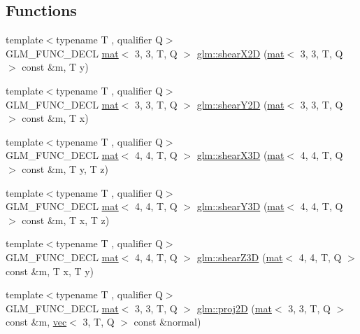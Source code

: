 \subsection*{Functions}
\begin{DoxyCompactItemize}
\item 
{\footnotesize template$<$typename T , qualifier Q$>$ }\\G\+L\+M\+\_\+\+F\+U\+N\+C\+\_\+\+D\+E\+CL \hyperlink{structglm_1_1mat}{mat}$<$ 3, 3, T, Q $>$ \hyperlink{group__gtx__transform2_gabf714b8a358181572b32a45555f71948}{glm\+::shear\+X2D} (\hyperlink{structglm_1_1mat}{mat}$<$ 3, 3, T, Q $>$ const \&m, T y)
\item 
{\footnotesize template$<$typename T , qualifier Q$>$ }\\G\+L\+M\+\_\+\+F\+U\+N\+C\+\_\+\+D\+E\+CL \hyperlink{structglm_1_1mat}{mat}$<$ 3, 3, T, Q $>$ \hyperlink{group__gtx__transform2_gac7998d0763d9181550c77e8af09a182c}{glm\+::shear\+Y2D} (\hyperlink{structglm_1_1mat}{mat}$<$ 3, 3, T, Q $>$ const \&m, T x)
\item 
{\footnotesize template$<$typename T , qualifier Q$>$ }\\G\+L\+M\+\_\+\+F\+U\+N\+C\+\_\+\+D\+E\+CL \hyperlink{structglm_1_1mat}{mat}$<$ 4, 4, T, Q $>$ \hyperlink{group__gtx__transform2_ga73e867c6cd4d700fe2054437e56106c4}{glm\+::shear\+X3D} (\hyperlink{structglm_1_1mat}{mat}$<$ 4, 4, T, Q $>$ const \&m, T y, T z)
\item 
{\footnotesize template$<$typename T , qualifier Q$>$ }\\G\+L\+M\+\_\+\+F\+U\+N\+C\+\_\+\+D\+E\+CL \hyperlink{structglm_1_1mat}{mat}$<$ 4, 4, T, Q $>$ \hyperlink{group__gtx__transform2_gade5bb65ffcb513973db1a1314fb5cfac}{glm\+::shear\+Y3D} (\hyperlink{structglm_1_1mat}{mat}$<$ 4, 4, T, Q $>$ const \&m, T x, T z)
\item 
{\footnotesize template$<$typename T , qualifier Q$>$ }\\G\+L\+M\+\_\+\+F\+U\+N\+C\+\_\+\+D\+E\+CL \hyperlink{structglm_1_1mat}{mat}$<$ 4, 4, T, Q $>$ \hyperlink{group__gtx__transform2_ga6591e0a3a9d2c9c0b6577bb4dace0255}{glm\+::shear\+Z3D} (\hyperlink{structglm_1_1mat}{mat}$<$ 4, 4, T, Q $>$ const \&m, T x, T y)
\item 
{\footnotesize template$<$typename T , qualifier Q$>$ }\\G\+L\+M\+\_\+\+F\+U\+N\+C\+\_\+\+D\+E\+CL \hyperlink{structglm_1_1mat}{mat}$<$ 3, 3, T, Q $>$ \hyperlink{group__gtx__transform2_ga5b992a0cdc8298054edb68e228f0d93e}{glm\+::proj2D} (\hyperlink{structglm_1_1mat}{mat}$<$ 3, 3, T, Q $>$ const \&m, \hyperlink{structglm_1_1vec}{vec}$<$ 3, T, Q $>$ const \&normal)

\end{DoxyCompactItemize}
